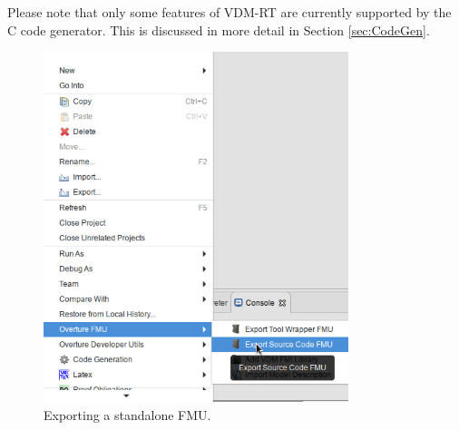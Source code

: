 Please note that only some features of VDM-RT are currently supported by the C code generator.
%
This is discussed in more detail in Section \ref{sec:CodeGen}.
%
%
%
\begin{figure}[ht]
\centering
\includegraphics[width=3.5in]{figures/standaloneExportOverture.png}
\caption{Exporting a standalone FMU.}
\label{fig:standaloneexportoverture}
\end{figure}
%
%
%
